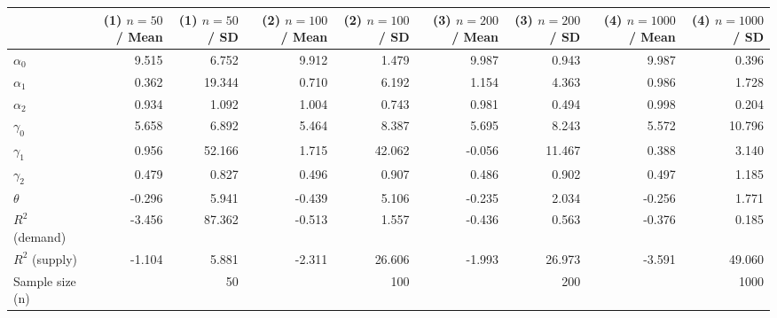 
\begin{tabular}[t]{lrrrrrrrr}
\toprule
  & (1) $n=50$ / Mean & (1) $n=50$ / SD & (2) $n=100$ / Mean & (2) $n=100$ / SD & (3) $n=200$ / Mean & (3) $n=200$ / SD & (4) $n=1000$ / Mean & (4) $n=1000$ / SD\\
\midrule
$\alpha_{0}$ & 9.515 & 6.752 & 9.912 & 1.479 & 9.987 & 0.943 & 9.987 & 0.396\\
$\alpha_{1}$ & 0.362 & 19.344 & 0.710 & 6.192 & 1.154 & 4.363 & 0.986 & 1.728\\
$\alpha_{2}$ & 0.934 & 1.092 & 1.004 & 0.743 & 0.981 & 0.494 & 0.998 & 0.204\\
$\gamma_{0}$ & 5.658 & 6.892 & 5.464 & 8.387 & 5.695 & 8.243 & 5.572 & 10.796\\
$\gamma_{1}$ & 0.956 & 52.166 & 1.715 & 42.062 & -0.056 & 11.467 & 0.388 & 3.140\\
$\gamma_{2}$ & 0.479 & 0.827 & 0.496 & 0.907 & 0.486 & 0.902 & 0.497 & 1.185\\
$\theta$ & -0.296 & 5.941 & -0.439 & 5.106 & -0.235 & 2.034 & -0.256 & 1.771\\
$R^{2}$ (demand) & -3.456 & 87.362 & -0.513 & 1.557 & -0.436 & 0.563 & -0.376 & 0.185\\
$R^{2}$ (supply) & -1.104 & 5.881 & -2.311 & 26.606 & -1.993 & 26.973 & -3.591 & 49.060\\
Sample size (n) &  & 50 &  & 100 &  & 200 &  & 1000\\
\bottomrule
\end{tabular}

